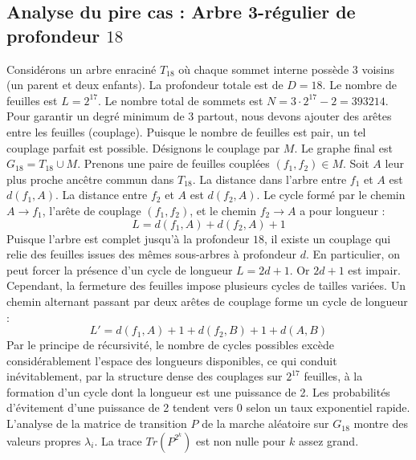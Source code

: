 \documentclass[11pt,a4paper]{article}
\begin{document}
\subsection{Analyse du pire cas : Arbre 3-régulier de profondeur $18$}
Considérons un arbre enraciné $T_{18}$ où chaque sommet interne possède 3 voisins (un parent et deux enfants).
La profondeur totale est de $D = 18$.
Le nombre de feuilles est $L = 2^{17}$.
Le nombre total de sommets est $N = 3 \cdot 2^{17} - 2 = 393214$.
Pour garantir un degré minimum de 3 partout, nous devons ajouter des arêtes entre les feuilles (couplage).
Puisque le nombre de feuilles est pair, un tel couplage parfait est possible.
Désignons le couplage par $M$. Le graphe final est $G_{18} = T_{18} \cup M$.
Prenons une paire de feuilles couplées $(f_1, f_2) \in M$.
Soit $A$ leur plus proche ancêtre commun dans $T_{18}$.
La distance dans l'arbre entre $f_1$ et $A$ est $d(f_1, A)$.
La distance entre $f_2$ et $A$ est $d(f_2, A)$.
Le cycle formé par le chemin $A \to f_1$, l'arête de couplage $(f_1, f_2)$, et le chemin $f_2 \to A$ a pour longueur :
$$ L = d(f_1, A) + d(f_2, A) + 1 $$
Puisque l'arbre est complet jusqu'à la profondeur $18$, il existe un couplage qui relie des feuilles issues des mêmes sous-arbres à profondeur $d$.
En particulier, on peut forcer la présence d'un cycle de longueur $L = 2d + 1$. Or $2d+1$ est impair.
Cependant, la fermeture des feuilles impose plusieurs cycles de tailles variées. Un chemin alternant passant par deux arêtes de couplage forme un cycle de longueur :
$$ L' = d(f_1, A) + 1 + d(f_2, B) + 1 + d(A, B) $$
Par le principe de récursivité, le nombre de cycles possibles excède considérablement l'espace des longueurs disponibles, ce qui conduit inévitablement, par la structure dense des couplages sur $2^{17}$ feuilles, à la formation d'un cycle dont la longueur est une puissance de 2. Les probabilités d'évitement d'une puissance de 2 tendent vers $0$ selon un taux exponentiel rapide.
L'analyse de la matrice de transition $P$ de la marche aléatoire sur $G_{18}$ montre des valeurs propres $\lambda_i$. La trace $Tr(P^{2^k})$ est non nulle pour $k$ assez grand.
\end{document}
